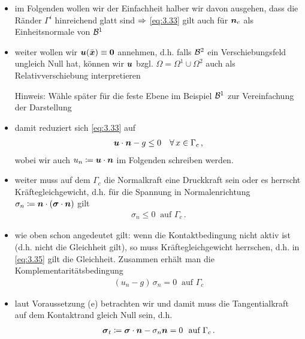\begin{itemize}
\item im Folgenden wollen wir der Einfachheit halber wir davon ausgehen, dass die Ränder $\Gamma^i$ hinreichend glatt sind $\Rightarrow$ \eqref{eq:3.33} gilt auch für $\boldsymbol n_c$ als Einheitsnormale von $\mathcal B^1$

\item weiter wollen wir $\boldsymbol u(\bar{\boldsymbol x})\equiv \boldsymbol 0$ annehmen, d.h. falls $\mathcal B^2$ ein Verschiebungsfeld ungleich Null hat, können wir $\boldsymbol u$ bzgl. $\Omega = \Omega^1\cup\Omega^2$ auch als Relativverschiebung interpretieren

\item[Hinweis:] Wähle später für die feste Ebene im Beispiel $\mathcal B^1$ zur Vereinfachung der Darstellung

\item damit reduziert sich \eqref{eq:3.33} auf
\begin{align}\label{eq:3.34}
	\boldsymbol u \cdot \boldsymbol n - g \le 0 \quad \forall \, x \in \Gamma_c \, ,
\end{align}
wobei wir auch $u_n \coloneqq \boldsymbol u \cdot \boldsymbol n$ im Folgenden schreiben werden.

\item weiter muss auf dem  $\Gamma_c$ die Normalkraft eine Druckkraft sein oder es herrscht Kräftegleichgewicht, d.h. für die Spannung in Normalenrichtung $\sigma_n \coloneqq \boldsymbol n\cdot (\boldsymbol \sigma\cdot \boldsymbol n)$ gilt
\begin{align}\label{eq:3.35}
	\sigma_n \le 0  \ \text{ auf }  \Gamma_c \, .
\end{align}

\item wie oben schon angedeutet gilt: wenn die Kontaktbedingung nicht aktiv ist (d.h. nicht die Gleichheit gilt), so muss Kräftegleichgewicht herrschen, d.h. in \eqref{eq:3.35} gilt die Gleichheit. Zusammen erhält man die Komplementaritätsbedingung
\begin{align}\label{eq:3.36}
	(u_n - g )\,   \sigma_n = 0 \ \text{ auf } \Gamma_c
\end{align}

\item laut Voraussetzung (e) betrachten wir  und damit muss die Tangentialkraft auf dem Kontaktrand gleich Null sein, d.h.
\begin{align}\label{eq:3.37}
	\bs \sigma_t \coloneqq \bs \sigma \cdot \bs n - \sigma_n \bs n = 0 \ \text{ auf } \Gamma_c \, .
\end{align}


\end{itemize}
